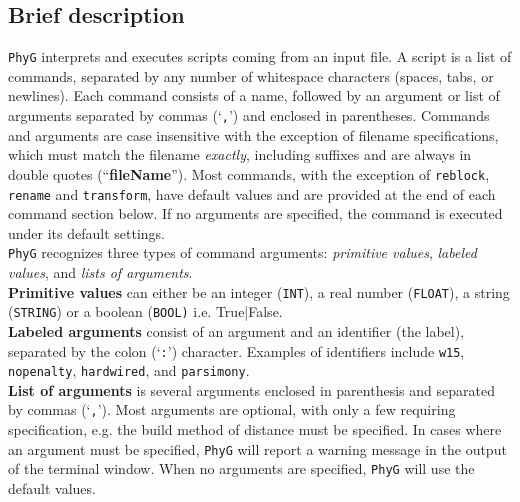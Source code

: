 \documentclass[11pt]{book}
\newcommand{\phyg}{\texttt{PhyG} }
\begin{document}
{{	\subsection{Brief description}
		\phyg interprets and executes scripts coming from an input file. A script is a list of 
		commands, separated by any number of whitespace characters (spaces, tabs, or 
		newlines). Each command consists of a name, followed by an argument or list of 
		arguments separated by commas (`\texttt{,}') and enclosed in parentheses. 
		Commands and arguments are case insensitive with the exception of filename 
		specifications, which must match the filename \textit{exactly}, including suffixes 
		and are always in double quotes (``\textbf{fileName}''). Most commands, with the 
		exception of \texttt{reblock}, \texttt{rename} and \texttt{transform}, have default values 
		and are provided at the end of each command section below. If no arguments are 
		specified, the command is executed under its default settings.\\
		
		\noindent \phyg recognizes three types of command arguments: \textit{primitive values}, 
		\textit{labeled values}, and \textit{lists of arguments}.\\
		
		\noindent \textbf{Primitive values} can either be an integer (\texttt{INT}), 
		a real number (\texttt{FLOAT}), a string (\texttt{STRING}) or a boolean (\texttt{BOOL)} 
		i.e. True|False. \\
		
		\noindent \textbf{Labeled arguments} consist of an argument and an identifier 
		(the label), separated by the colon (`\texttt{:}') character. Examples of 
		identifiers include \texttt{w15}, \texttt{nopenalty}, \texttt{hardwired}, and 
		\texttt{parsimony}. \\ %
		
		\noindent \textbf{List of arguments} is several arguments enclosed in parenthesis 
		and separated by commas (`\texttt{,}'). Most arguments are optional, with only a 
		few requiring specification, e.g. the build method of distance must be specified. 
		In cases where an argument must be specified, \phyg will report a warning message 
		in the output of the terminal window. When no arguments are specified, \phyg will 
		use the default values.\\
		
}}
\end{document}
